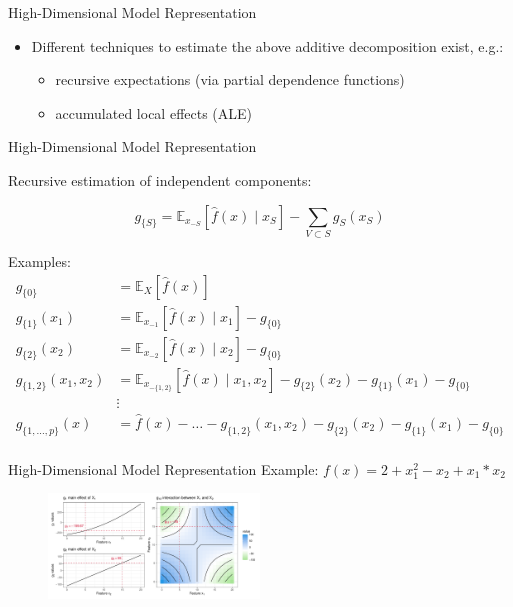 \documentclass[11pt,compress,t,notes=noshow, aspectratio=169, xcolor=table]{beamer}
\begin{document}
\begin{frame}{High-Dimensional Model Representation }
\begin{itemize}
\item Different techniques to estimate the above additive decomposition exist, e.g.:
		\begin{itemize}
			\item recursive expectations (via partial dependence functions) 
			\item accumulated local effects (ALE)
		\end{itemize}
\end{itemize}
\end{frame}

\begin{frame}{High-Dimensional Model Representation}

Recursive estimation of independent components:

$$g_{\{S\}} = \mathbb{E}_{x_{-S}}\left[\widehat{f}(x) \; \vert  \; x_S \right] - \sum_{V \subset S} g_S(x_S)$$

Examples:
\begin{align*}
 g_{\{0\}} &= \mathbb{E}_X\left[\widehat{f}(x)\right] \\
 g_{\{1\}}(x_1) &= \mathbb{E}_{x_{-1}}\left[\widehat{f}(x) \; \vert  \; x_1 \right] - g_{\{0\}} \\
 g_{\{2\}}(x_2) &= \mathbb{E}_{x_{-2}}\left[\widehat{f}(x) \; \vert  \; x_2 \right] - g_{\{0\}} \\
 g_{\{1, 2\}}(x_1, x_2) &= \mathbb{E}_{x_{-\{1,2\}}}\left[\widehat{f}(x) \; \vert \; x_1, x_2 \right] - g_{\{2\}}(x_2) - g_{\{1\}}(x_1) - g_{\{0\}}\\
 &\vdots \\
 g_{\{1, \dots, p\}}(x) &= \widehat{f}(x) - \dots - g_{\{1, 2\}}(x_1, x_2) %
 - g_{\{2\}}(x_2) - g_{\{1\}}(x_1) - g_{\{0\}}\\
\end{align*}

\end{frame}

\begin{frame}{High-Dimensional Model Representation}
Example:
$f(x) = 2 + x_1^2 - x_2 + x_1 * x_2$
\begin{figure}
\includegraphics[width = 0.5\textwidth]{figure/interaction2}
\end{figure}
\end{frame}
\end{document}

